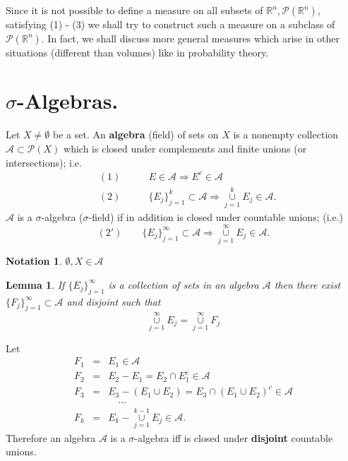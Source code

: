 \documentclass[12pt]{report}
\newtheorem{lemma}[theorem]{Lemma}
\newtheorem{no}[theorem]{Notation}
\begin{document}
\medskip Since it is not possible to define a measure on all subsets of
$\mathbb{R}^n,
\mathcal{P} (\mathbb{R}^n)$, satisfying (1) - (3) we shall try to construct
such a  measure on a subclass of $\mathcal{P} (\mathbb{R}^n)$.  In fact, we
shall discuss more general measures which arise in other situations
(different than volumes) like in probability theory.


\section{$\sigma$-Algebras.}
 Let $X \ne \emptyset$ be a set.  An {\bf algebra} (field) of sets on $X$
is a nonempty collection
$\mathcal{A} \subset \mathcal{P}(X)$ which is closed under complements
and finite unions (or intersections); i.e.
\begin{eqnarray*}
 &(1) \qquad &E \in \mathcal{A} \Longrightarrow E^c \in \mathcal{A}\\ 
&(2) \qquad &\{E_j\}^k_{j=1} \subset
\mathcal{A} \Longrightarrow
\overset{k}{\underset{j=1}{\cup}}  E_j\in\mathcal{A}.
\end{eqnarray*}
$\mathcal{A}$ is a  $\sigma$-algebra ($\sigma$-field) if in addition is
closed under countable unions; (i.e.)
\begin{equation*} (2')\qquad
 \{E_j\}^\infty_{j=1} \subset \mathcal{A} \Longrightarrow
\overset{\infty}{\underset{j=1}{\cup}}  E_j
\in \mathcal{A}.
\end{equation*}
 
\begin{no}  $\emptyset, X \in \mathcal{A}$
\end{no}

\begin{lemma}  If $\{E_j\}^\infty_{j=1}$ is a collection of sets in an algebra
$\mathcal{A}$ then there exist $\{F_j\}^\infty_{j=1} \subset
\mathcal{A}$ and disjoint such that
\[
\overset{\infty}{\underset{j=1}{\cup}} E_j =
\overset{\infty}{\underset{j=1}{\cup}}
 F_j
\]
\end{lemma}
  Let
\begin{eqnarray*}
 F_1 &=& E_1 \in \mathcal{A}\\  F_2 &=& E_2 - E_1 = E_2 \cap E^c_1 \in
\mathcal{A}\\
 F_3 &=& E_3 - (E_1 \cup E_2) =E_3 \cap (E_1 \cup E_2)^c \in \mathcal{A}\\
 &\ &\quad \dots\\ F_k &=& E_k - \overset{k-1}{\underset{j=1}{\cup}}  E_j
\in
\mathcal{A}.
\end{eqnarray*} Therefore an algebra $\mathcal{A}$ is a $\sigma$-algebra
iff is closed under {\bf disjoint} countable unions.
\end{document}
